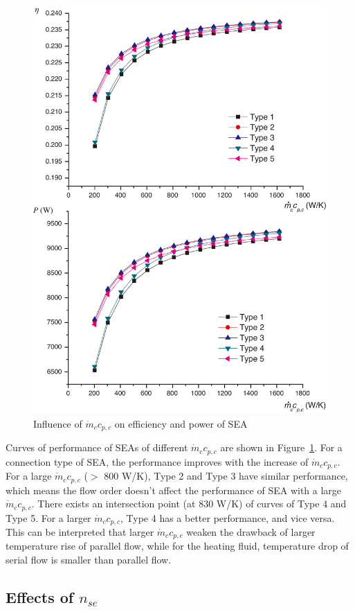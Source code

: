 \noindent \begin{figure}[htbp]
\begin{center}
	\includegraphics[width = 0.7\columnwidth]{fig/qm_ccp_c}
	\caption{Influence of $\dot{m}_cc_{p,c}$ on efficiency and power of SEA}
	\label{fig:qm_ccp_c}
\end{center}
\end{figure}

Curves of performance of SEAs of different $\dot{m}_cc_{p,c}$ are shown in Figure~\ref{fig:qm_ccp_c}. For a connection type of SEA, the performance improves with the increase of $\dot{m}_cc_{p,c}$. For a large $\dot{m}_cc_{p,c}$ ($>$ 800 W/K), Type 2 and Type 3 have similar performance, which means the flow order doesn't affect the performance of SEA with a large $\dot{m}_cc_{p,c}$. There exists an intersection point (at 830 W/K) of curves of Type 4 and Type 5. For a larger $\dot{m}_cc_{p,c}$, Type 4 has a better performance, and vice versa. This can be interpreted that larger $\dot{m}_cc_{p,c}$ weaken the drawback of larger temperature rise of parallel flow, while for the heating fluid, temperature drop of serial flow is smaller than parallel flow.

\subsection{Effects of $n_{se}$}

